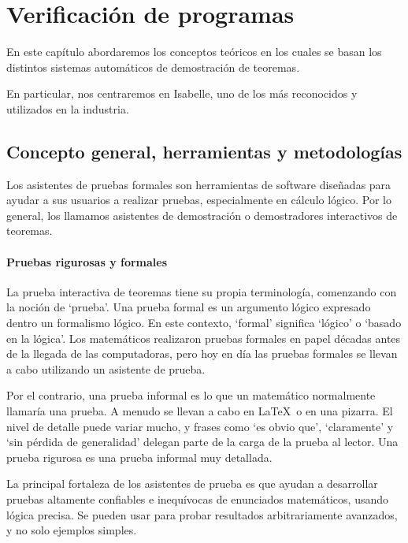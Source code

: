 \documentclass[12pt]{book}
\begin{document}

\chapter{Verificación de programas}

En este capítulo abordaremos los conceptos teóricos en los cuales se basan los distintos sistemas automáticos de demostración de teoremas.

En particular, nos centraremos en Isabelle, uno de los más reconocidos y utilizados en la industria.

\section{Concepto general, herramientas y metodologías}

Los asistentes de pruebas formales son herramientas de software diseñadas para ayudar a sus usuarios a realizar pruebas, especialmente en cálculo lógico. Por lo general, los llamamos asistentes de demostración o demostradores interactivos de teoremas.

\subsubsection{Pruebas rigurosas y formales}

La prueba interactiva de teoremas tiene su propia terminología, comenzando con la noción de `prueba'. Una prueba formal es un argumento lógico expresado dentro un formalismo lógico. En este contexto, `formal' significa `lógico' o `basado en la lógica'. Los matemáticos realizaron pruebas formales en papel décadas antes de la llegada de las computadoras, pero hoy en día las pruebas formales se llevan a cabo utilizando un asistente de prueba.

Por el contrario, una prueba informal es lo que un matemático normalmente llamaría una prueba. A menudo se llevan a cabo en \LaTeX\ o en una pizarra. El nivel de detalle puede variar mucho, y frases como `es obvio que', `claramente' y `sin pérdida de generalidad' delegan parte de la carga de la prueba al lector. Una prueba rigurosa es una prueba informal muy detallada.

La principal fortaleza de los asistentes de prueba es que ayudan a desarrollar pruebas altamente confiables e inequívocas de enunciados matemáticos, usando lógica precisa. Se pueden usar para probar resultados arbitrariamente avanzados, y no solo ejemplos simples.
\end{document}
